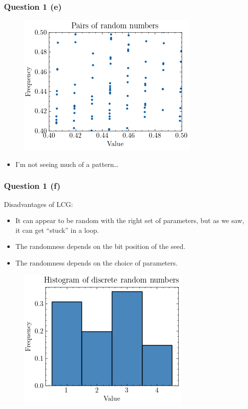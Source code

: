 \documentclass[compress,12pt]{beamer}
\begin{document}
\begin{frame}
      \frametitle{Question 1 (e)}
      \begin{figure}
            \centering
            \includegraphics[scale=0.6]{imgs/pairs.png}
      \end{figure}
      \begin{itemize}
            \item I'm not seeing much of a pattern\dots
      \end{itemize}
\end{frame}

\begin{frame}
      \frametitle{Question 1 (f)}
      Disadvantages of LCG:
      \begin{itemize}
            \item It can appear to be random with the right set of parameters, but as we saw, it can get ``stuck'' in a loop.
            \item The randomness depends on the bit position of the seed.
            \item The randomness depends on the choice of parameters.
      \end{itemize}
\end{frame}

\begin{frame}
      \begin{figure}
            \centering
            \includegraphics[scale=0.6]{imgs/discrete.png}
      \end{figure}
      
\end{frame}
\end{document}
